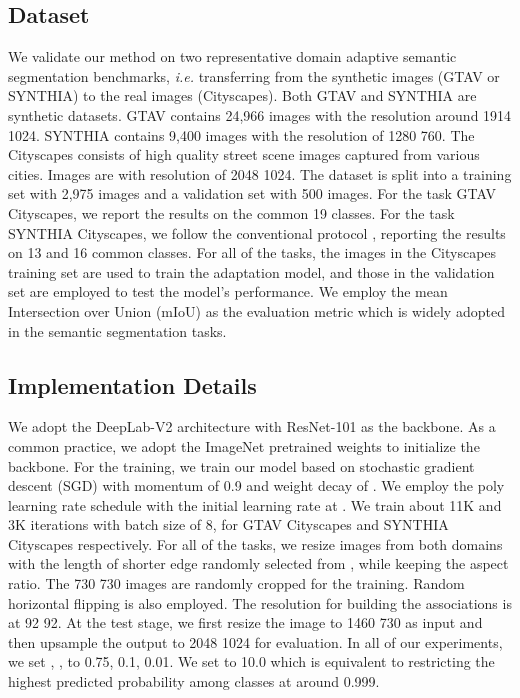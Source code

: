 \subsection{Dataset}
We validate our method on two representative domain adaptive semantic segmentation benchmarks, \emph{i.e.}
transferring from the synthetic images (GTAV or SYNTHIA) to the real images (Cityscapes).
Both GTAV and SYNTHIA are synthetic datasets. 
GTAV contains 24,966 images with the resolution around 1914  1024. 
SYNTHIA contains 9,400 images with the resolution of 1280  760. 
The Cityscapes consists of high quality street scene images captured from various
cities. Images are with resolution of 2048  1024. 
The dataset is split into a training set with 2,975 images and a validation set with 500 images. 
For the task GTAV  Cityscapes, we report the results on the common 19 classes.
For the task SYNTHIA  Cityscapes, we follow the conventional protocol \cite{chang2019all,chen2019domain,zou2019confidence,tsai2019domain},
reporting the results on 13 and 16 common classes.
For all of the tasks, the images in the Cityscapes training set are used to train the adaptation model,
and those in the validation set are employed to test the model's performance.
We employ the mean Intersection over Union (mIoU) as the evaluation metric 
which is widely adopted in the semantic segmentation tasks.

\subsection{Implementation Details}
We adopt the DeepLab-V2 \cite{chen2017deeplab} architecture
with ResNet-101 as the backbone.
As a common practice, we adopt the ImageNet \cite{deng2009imagenet} pretrained weights to initialize the backbone.
For the training, we train our model based on stochastic gradient descent (SGD) with momentum of 0.9 and weight decay of .
We employ the poly learning rate schedule with the initial learning rate at .
We train about 11K and 3K iterations with batch size of 8,
for GTAV  Cityscapes and SYNTHIA  Cityscapes respectively.
For all of the tasks, 
we resize images from both domains with the length of shorter edge randomly selected from , while keeping the aspect ratio.
The 730  730 images are randomly cropped for the training.
Random horizontal flipping is also employed.
The resolution for building the associations is at 92  92.
At the test stage, we first resize the image to 1460  730 as input and then upsample the output to 2048  1024 for evaluation.
In all of our experiments, we set , ,  to 0.75, 0.1, 0.01.
We set  to 10.0 which is equivalent to restricting the highest predicted probability among classes at around 0.999.



